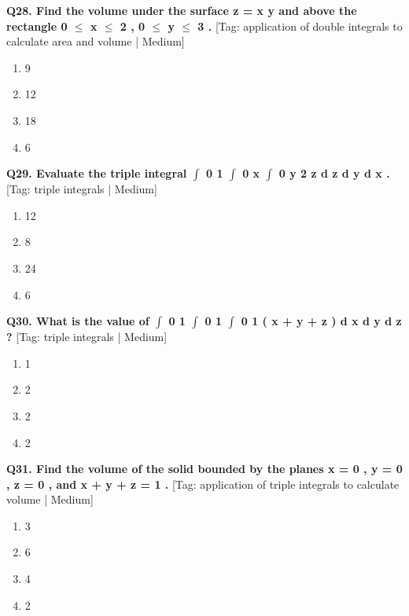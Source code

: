 \noindent\textbf{Q28. Find the volume under the surface z = x y and above the rectangle 0 $\le$ x $\le$ 2 , 0 $\le$ y $\le$ 3 .} \hfill [Tag: application of double integrals to calculate area and volume | Medium]
\begin{enumerate}[label=(\alph*),topsep=2pt,itemsep=1pt,partopsep=0pt,parsep=0pt]
    \item {{9}}
    \item {{12}}
    \item {{18}}
    \item {{6}}
\end{enumerate}
\vspace{2mm}

\noindent\textbf{Q29. Evaluate the triple integral $\int$ 0 1 $\int$ 0 x $\int$ 0 y 2 z d z d y d x .} \hfill [Tag: triple integrals | Medium]
\begin{enumerate}[label=(\alph*),topsep=2pt,itemsep=1pt,partopsep=0pt,parsep=0pt]
    \item {{12}}
    \item {{8}}
    \item {{24}}
    \item {{6}}
\end{enumerate}
\vspace{2mm}

\noindent\textbf{Q30. What is the value of $\int$ 0 1 $\int$ 0 1 $\int$ 0 1 ( x + y + z ) d x d y d z ?} \hfill [Tag: triple integrals | Medium]
\begin{enumerate}[label=(\alph*),topsep=2pt,itemsep=1pt,partopsep=0pt,parsep=0pt]
    \item {{1}}
    \item {{2}}
    \item {{2}}
    \item {{2}}
\end{enumerate}
\vspace{2mm}

\noindent\textbf{Q31. Find the volume of the solid bounded by the planes x = 0 , y = 0 , z = 0 , and x + y + z = 1 .} \hfill [Tag: application of triple integrals to calculate volume | Medium]
\begin{enumerate}[label=(\alph*),topsep=2pt,itemsep=1pt,partopsep=0pt,parsep=0pt]
    \item {{3}}
    \item {{6}}
    \item {{4}}
    \item {{2}}
\end{enumerate}
\vspace{2mm}

